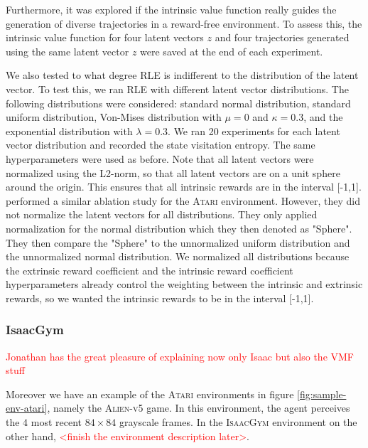 \documentclass[10pt]{article} %
\begin{document}
Furthermore, it was explored if the intrinsic value function really guides the generation of diverse trajectories in a reward-free environment. To assess this, the intrinsic value function for four latent vectors $z$ and four trajectories generated using the same latent vector $z$ were saved at the end of each experiment. 

We also tested to what degree RLE is indifferent to the distribution of the latent vector. To test this, we ran RLE with different latent vector distributions. The following distributions were considered: standard normal distribution, standard uniform distribution, Von-Mises distribution with $\mu=0$ and $\kappa=0.3$, and the exponential distribution with $\lambda=0.3$. We ran 20 experiments for each latent vector distribution and recorded the state visitation entropy. The same hyperparameters were used as before. Note that all latent vectors were normalized using the L2-norm, so that all latent vectors are on a unit sphere around the origin. This ensures that all intrinsic rewards are in the interval [-1,1]. \cite{rle-paper} performed a similar ablation study for the \textsc{Atari} environment. However, they did not normalize the latent vectors for all distributions. They only applied normalization for the normal distribution which they then denoted as "Sphere". They then compare the "Sphere" to the unnormalized uniform distribution and the unnormalized normal distribution. We normalized all distributions because the extrinsic reward coefficient and the intrinsic reward coefficient hyperparameters already control the weighting between the intrinsic and extrinsic rewards, so we wanted the intrinsic rewards to be in the interval [-1,1].


\subsubsection{IsaacGym}
\textcolor{red}{Jonathan has the great pleasure of explaining now only Isaac but also the VMF stuff}

\noindent Moreover we have an example of the \textsc{Atari} environments in figure \ref{fig:sample-env-atari}, namely the \textsc{Alien-v5} game. In this environment, the agent perceives the $4$ most recent $84\times84$ grayscale frames. In the \textsc{IsaacGym} environment on the other hand, \textcolor{red}{<finish the environment description later>}.
\end{document}
